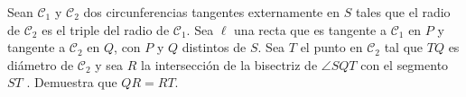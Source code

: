 Sean $\mathcal{C}_1$ y $\mathcal{C}_2$ dos circunferencias tangentes externamente en $S$ tales que el radio de $\mathcal{C}_2$ es el triple del radio de $\mathcal{C}_1$. Sea $\ell$ una recta que es tangente a $\mathcal{C}_1$ en $P$ y tangente a $\mathcal{C}_2$ en $Q$, con $P$ y $Q$ distintos de $S$. Sea $T$ el punto en $\mathcal{C}_2$ tal que $TQ$ es diámetro de $\mathcal{C}_2$ y sea $R$ la
intersección de la bisectriz de $\angle SQT$ con el segmento $ST$ . Demuestra que $QR = RT$.